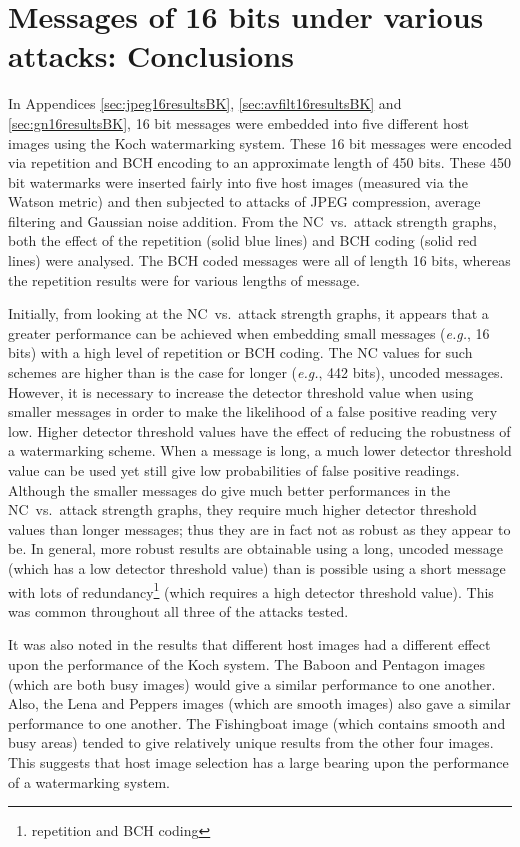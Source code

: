 \documentclass[12pt]{report}
\begin{document}
\section{Messages of 16 bits under various attacks: Conclusions}
\label{sec:conc16bits}
In Appendices \ref{sec:jpeg16resultsBK}, \ref{sec:avfilt16resultsBK} and \ref{sec:gn16resultsBK},
16 bit messages were embedded into five different host images using the Koch watermarking system.
These 16 bit messages were encoded via repetition and BCH encoding to an approximate length of 450 bits.
These 450 bit watermarks were inserted fairly into five host images (measured via the Watson metric) and then
subjected to attacks of JPEG compression, average filtering and Gaussian noise addition.
From the NC~vs.~attack strength graphs, both the effect of the repetition 
(solid blue lines) and BCH coding (solid red lines) were analysed.
The BCH coded messages were all of length 16 bits, whereas the repetition results were for various lengths of message.

Initially, from looking at the NC~vs.~attack strength graphs, it appears that a greater performance can 
be achieved when embedding small messages (\emph{e.g.}, 16 bits) with a high level of repetition or BCH coding. 
The NC values for such schemes are higher than is the case for longer (\emph{e.g.}, 442 bits), 
uncoded messages. However, it is necessary to increase the detector threshold value when 
using smaller messages in order to make the likelihood of a false positive reading very low. 
Higher detector threshold values have the effect of reducing the robustness of a watermarking scheme.
When a message is long, a much lower detector threshold value can be used yet still give
low probabilities of false positive readings. Although the smaller messages do give much better
performances in the NC~vs.~attack strength graphs,
they require much higher detector threshold values than longer messages; thus they are in fact not 
as robust as they appear to be.
In general, more robust results are obtainable using a long, uncoded message (which has a low detector threshold value)
than is possible using a short message with lots of redundancy\footnote{repetition and BCH coding} (which requires a high 
detector threshold value). This was common throughout all three of the attacks tested.

It was also noted in the results that different host images had a different effect upon the 
performance of the Koch system. The Baboon and Pentagon images (which are both busy images) would 
give a similar performance to one another. 
Also, the Lena and Peppers images (which are smooth images) also gave a similar 
performance to one another. The Fishingboat image (which contains smooth and busy areas) 
tended to give relatively unique results from 
the other four images. This suggests that host image selection has a large bearing upon the 
performance of a watermarking system.
\end{document}
